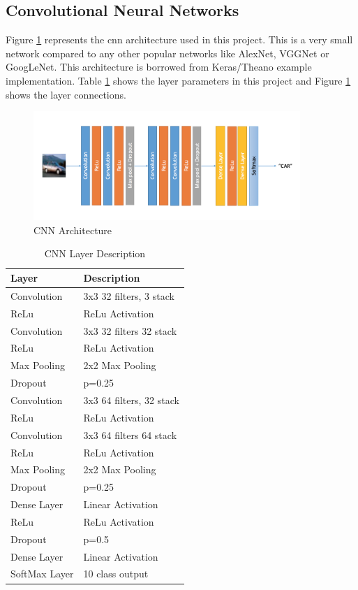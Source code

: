 \documentclass[12pt]{article}
\begin{document}
\subsection{Convolutional Neural Networks}
Figure \ref{img:cnn_arch} represents the cnn architecture used in this project. This is a very small network compared to any other popular networks like AlexNet, VGGNet or GoogLeNet. This architecture is borrowed from Keras\citep{ref:keras}/Theano example implementation. Table \ref{tab:cnn_layers} shows the layer parameters in this project and Figure \ref{img:cnn_arch} shows the layer connections. 
\begin{figure}[H]
\centering
%
\includegraphics[width=0.9\textwidth]{images/cnn_arch.png} 
\caption{CNN Architecture}
\label{img:cnn_arch}
\end{figure}
\begin{table}[H]
\centering
\begin{tabular}{| l | l |} \hline
\textbf{Layer} & \textbf{Description}\\ \hline
Convolution & 3x3 32 filters, 3 stack \\ \hline
ReLu & ReLu Activation \\ \hline
Convolution & 3x3 32 filters 32 stack \\ \hline
ReLu & ReLu Activation \\ \hline
Max Pooling & 2x2 Max Pooling \\ \hline
Dropout & p=0.25 \\ \hline
Convolution & 3x3 64 filters, 32 stack \\ \hline
ReLu & ReLu Activation \\ \hline
Convolution & 3x3 64 filters 64 stack \\ \hline
ReLu & ReLu Activation \\ \hline
Max Pooling & 2x2 Max Pooling \\ \hline
Dropout & p=0.25 \\ \hline
Dense Layer & Linear Activation \\ \hline
ReLu & ReLu Activation \\ \hline
Dropout & p=0.5 \\ \hline
Dense Layer & Linear Activation \\ \hline
SoftMax Layer & 10 class output \\ \hline
\end{tabular}
\caption{CNN Layer Description}
\label{tab:cnn_layers}
\end{table}
\end{document}
